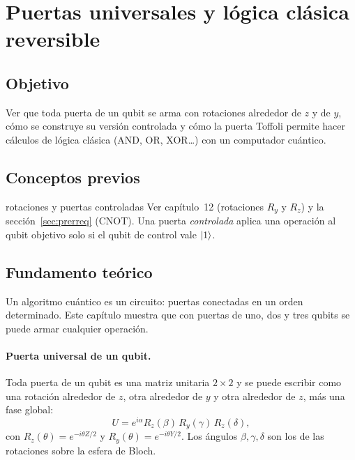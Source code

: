 \def\tituloconcepto{Puertas universales y lógica reversible}


\section{Puertas universales y lógica clásica reversible}

\subsection{Objetivo}
Ver que toda puerta de un qubit se arma con rotaciones alrededor de $z$ y de $y$,
cómo se construye su versión controlada y cómo la puerta Toffoli permite
hacer cálculos de lógica clásica (AND, OR, XOR\ldots) con un computador cuántico.

\subsection{Conceptos previos}
\begin{concepto}{rotaciones y puertas controladas}
Ver capítulo~12 (rotaciones $R_y$ y $R_z$) y la sección~\ref{sec:prerreq}
(CNOT). Una puerta \emph{controlada} aplica una operación al qubit objetivo
solo si el qubit de control vale $\left|1\right\rangle$.
\end{concepto}

\subsection{Fundamento teórico}
Un algoritmo cuántico es un circuito: puertas conectadas en un orden
determinado. Este capítulo muestra que con puertas de uno, dos y tres qubits se
puede armar cualquier operación.

\paragraph{Puerta universal de un qubit.} Toda puerta de un qubit es una matriz
unitaria $2\times2$ y se puede escribir como una rotación alrededor de $z$,
otra alrededor de $y$ y otra alrededor de $z$, más una fase global:
\begin{equation}
  U=e^{i\alpha}R_z(\beta)\,R_y(\gamma)\,R_z(\delta),
\end{equation}
con $R_z(\theta)=e^{-i\theta Z/2}$ y $R_y(\theta)=e^{-i\theta Y/2}$. Los ángulos
$\beta,\gamma,\delta$ son los de las rotaciones sobre la esfera de Bloch.

